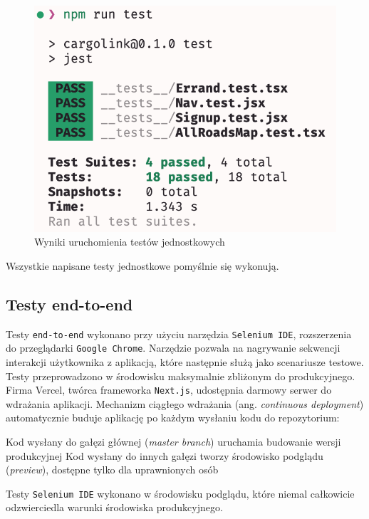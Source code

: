 \begin{figure}[H]
	\centering
		\includegraphics[width=0.5\linewidth]{rozdzial2/testy_jednostkowe_wyniki.png}
	\caption{Wyniki uruchomienia testów jednostkowych}
	\label{Testy jednostkowe wyniki}
\end{figure}

Wszystkie napisane testy jednostkowe pomyślnie się wykonują.

\subsection{Testy end-to-end}

Testy \texttt{end-to-end} wykonano przy użyciu narzędzia \texttt{Selenium IDE}, rozszerzenia do przeglądarki \texttt{Google Chrome}. Narzędzie pozwala na nagrywanie sekwencji interakcji użytkownika z aplikacją, które następnie służą jako scenariusze testowe.
Testy przeprowadzono w środowisku maksymalnie zbliżonym do produkcyjnego. Firma Vercel, twórca frameworka \texttt{Next.js}, udostępnia darmowy serwer do wdrażania aplikacji. Mechanizm ciągłego wdrażania (ang. \emph{continuous deployment}) automatycznie buduje aplikację po każdym wysłaniu kodu do repozytorium:

Kod wysłany do gałęzi głównej (\emph{master branch}) uruchamia budowanie wersji produkcyjnej
Kod wysłany do innych gałęzi tworzy środowisko podglądu (\emph{preview}), dostępne tylko dla uprawnionych osób

Testy \texttt{Selenium IDE} wykonano w środowisku podglądu, które niemal całkowicie odzwierciedla warunki środowiska produkcyjnego.
